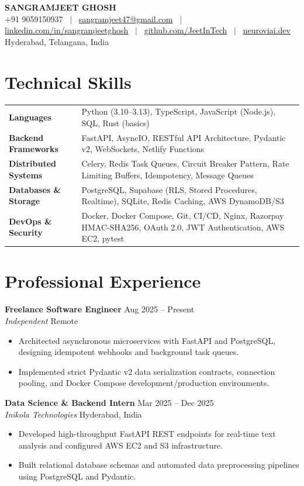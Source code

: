 \documentclass[10pt]{article}
\makeatletter
\newcommand{\resumeHeader}{
\begin{center}
{\LARGE \textbf{SANGRAMJEET GHOSH}} \\[3pt]
{\small
+91 9059150937 ~$|$~
\href{mailto:sangramjeet47@gmail.com}{sangramjeet47@gmail.com} ~$|$~
\href{https://www.linkedin.com/in/sangramjeetghosh}{linkedin.com/in/sangramjeetghosh} ~$|$~
\href{https://github.com/JeetInTech}{github.com/JeetInTech} ~$|$~
\href{https://neuroviai.dev}{neuroviai.dev}
}\\[1pt]
{\footnotesize Hyderabad, Telangana, India}
\end{center}
\vspace{-8pt}
}
\makeatother
\begin{document}
\resumeHeader

\section*{Technical Skills}
\begin{tabularx}{\textwidth}{@{}l X@{}}
\textbf{Languages} & Python (3.10--3.13), TypeScript, JavaScript (Node.js), SQL, Rust (basics) \\[1.5pt]
\textbf{Backend Frameworks} & FastAPI, AsyncIO, RESTful API Architecture, Pydantic v2, WebSockets, Netlify Functions \\[1.5pt]
\textbf{Distributed Systems} & Celery, Redis Task Queues, Circuit Breaker Pattern, Rate Limiting Buffers, Idempotency, Message Queues \\[1.5pt]
\textbf{Databases \& Storage} & PostgreSQL, Supabase (RLS, Stored Procedures, Realtime), SQLite, Redis Caching, AWS DynamoDB/S3 \\[1.5pt]
\textbf{DevOps \& Security} & Docker, Docker Compose, Git, CI/CD, Nginx, Razorpay HMAC-SHA256, OAuth 2.0, JWT Authentication, AWS EC2, pytest \\
\end{tabularx}

\section*{Professional Experience}
\textbf{Freelance Software Engineer} \hfill Aug 2025 -- Present \\
\textit{Independent} \hfill Remote
\begin{itemize}
    \item Architected asynchronous microservices with FastAPI and PostgreSQL, designing idempotent webhooks and background task queues.
    \item Implemented strict Pydantic v2 data serialization contracts, connection pooling, and Docker Compose development/production environments.
\end{itemize}

\vspace{1.5pt}
\textbf{Data Science \& Backend Intern} \hfill Mar 2025 -- Dec 2025 \\
\textit{Inikola Technologies} \hfill Hyderabad, India
\begin{itemize}
    \item Developed high-throughput FastAPI REST endpoints for real-time text analysis and configured AWS EC2 and S3 infrastructure.
    \item Built relational database schemas and automated data preprocessing pipelines using PostgreSQL and Pydantic.
\end{itemize}
\end{document}
